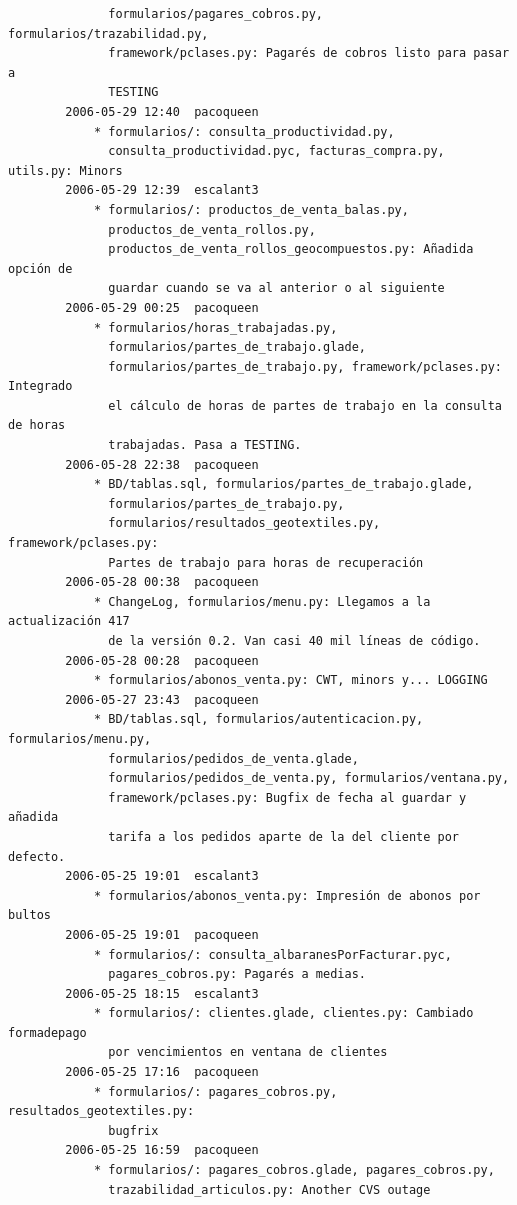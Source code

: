 \documentclass[a4paper]{article}
\begin{document}
\begin{verbatim}
              formularios/pagares_cobros.py, formularios/trazabilidad.py,
              framework/pclases.py: Pagarés de cobros listo para pasar a
              TESTING
        2006-05-29 12:40  pacoqueen
            * formularios/: consulta_productividad.py,
              consulta_productividad.pyc, facturas_compra.py, utils.py: Minors
        2006-05-29 12:39  escalant3
            * formularios/: productos_de_venta_balas.py,
              productos_de_venta_rollos.py,
              productos_de_venta_rollos_geocompuestos.py: Añadida opción de
              guardar cuando se va al anterior o al siguiente
        2006-05-29 00:25  pacoqueen
            * formularios/horas_trabajadas.py,
              formularios/partes_de_trabajo.glade,
              formularios/partes_de_trabajo.py, framework/pclases.py: Integrado
              el cálculo de horas de partes de trabajo en la consulta de horas
              trabajadas. Pasa a TESTING.
        2006-05-28 22:38  pacoqueen
            * BD/tablas.sql, formularios/partes_de_trabajo.glade,
              formularios/partes_de_trabajo.py,
              formularios/resultados_geotextiles.py, framework/pclases.py:
              Partes de trabajo para horas de recuperación
        2006-05-28 00:38  pacoqueen
            * ChangeLog, formularios/menu.py: Llegamos a la actualización 417
              de la versión 0.2. Van casi 40 mil líneas de código.
        2006-05-28 00:28  pacoqueen
            * formularios/abonos_venta.py: CWT, minors y... LOGGING
        2006-05-27 23:43  pacoqueen
            * BD/tablas.sql, formularios/autenticacion.py, formularios/menu.py,
              formularios/pedidos_de_venta.glade,
              formularios/pedidos_de_venta.py, formularios/ventana.py,
              framework/pclases.py: Bugfix de fecha al guardar y añadida
              tarifa a los pedidos aparte de la del cliente por defecto.
        2006-05-25 19:01  escalant3
            * formularios/abonos_venta.py: Impresión de abonos por bultos
        2006-05-25 19:01  pacoqueen
            * formularios/: consulta_albaranesPorFacturar.pyc,
              pagares_cobros.py: Pagarés a medias.
        2006-05-25 18:15  escalant3
            * formularios/: clientes.glade, clientes.py: Cambiado formadepago
              por vencimientos en ventana de clientes
        2006-05-25 17:16  pacoqueen
            * formularios/: pagares_cobros.py, resultados_geotextiles.py:
              bugfrix
        2006-05-25 16:59  pacoqueen
            * formularios/: pagares_cobros.glade, pagares_cobros.py,
              trazabilidad_articulos.py: Another CVS outage

\end{verbatim}
\end{document}
